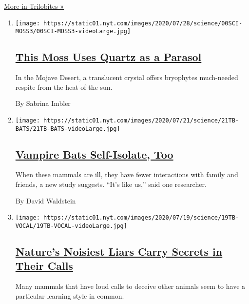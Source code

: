 \href{/column/trilobites}{More in Trilobites »}

\begin{enumerate}
\def\labelenumi{\arabic{enumi}.}
\item
  \texttt{[image: https://static01.nyt.com/images/2020/07/28/science/00SCI-MOSS3/00SCI-MOSS3-videoLarge.jpg]}

  \hypertarget{this-moss-uses-quartz-as-a-parasol}{%
  \subsection{\texorpdfstring{\href{/2020/07/29/science/moss-quartz-biology-syntrichia.html}{This
  Moss Uses Quartz as a
  Parasol}}{This Moss Uses Quartz as a Parasol}}\label{this-moss-uses-quartz-as-a-parasol}}

  In the Mojave Desert, a translucent crystal offers bryophytes
  much-needed respite from the heat of the sun.

  By Sabrina Imbler
\item
  \texttt{[image: https://static01.nyt.com/images/2020/07/21/science/21TB-BATS/21TB-BATS-videoLarge.jpg]}

  \hypertarget{vampire-bats-self-isolate-too}{%
  \subsection{\texorpdfstring{\href{/2020/07/22/science/vampire-bats-viruses.html}{Vampire
  Bats Self-Isolate,
  Too}}{Vampire Bats Self-Isolate, Too}}\label{vampire-bats-self-isolate-too}}

  When these mammals are ill, they have fewer interactions with family
  and friends, a new study suggests. ``It's like us,'' said one
  researcher.

  By David Waldstein
\item
  \texttt{[image: https://static01.nyt.com/images/2020/07/19/science/19TB-VOCAL/19TB-VOCAL-videoLarge.jpg]}

  \hypertarget{natures-noisiest-liars-carry-secrets-in-their-calls}{%
  \subsection{\texorpdfstring{\href{/2020/07/21/science/mammals-vocal-learning.html}{Nature's
  Noisiest Liars Carry Secrets in Their
  Calls}}{Nature's Noisiest Liars Carry Secrets in Their Calls}}\label{natures-noisiest-liars-carry-secrets-in-their-calls}}

  Many mammals that have loud calls to deceive other animals seem to
  have a particular learning style in common.


\end{enumerate}
